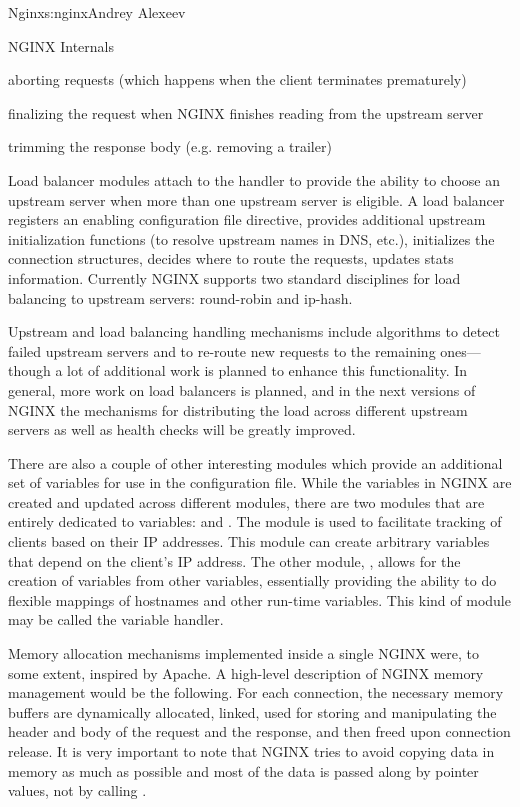 \begin{aosachapter}{Nginx}{s:nginx}{Andrey Alexeev}
\begin{aosasect1}{NGINX Internals}
\begin{aosaitemize}
\item aborting requests (which happens when the client terminates
  prematurely)

\item finalizing the request when NGINX finishes reading from the
  upstream server

\item trimming the response body (e.g. removing a trailer)

\end{aosaitemize}

Load balancer modules attach to the  handler to
provide the ability to choose an upstream server when more than one
upstream server is eligible. A load balancer registers an enabling
configuration file directive, provides additional upstream
initialization functions (to resolve upstream names in DNS, etc.),
initializes the connection structures, decides where to route the
requests, updates stats %
information. Currently NGINX supports two standard disciplines for
load balancing to upstream servers: round-robin and ip-hash.

Upstream and load balancing handling mechanisms include algorithms to
detect failed upstream servers and to re-route new requests to the
remaining ones---though a lot of additional work is planned to enhance
this functionality. In general, more work on load balancers is
planned, and in the next versions of NGINX the mechanisms for
distributing the load across different upstream servers as well as
health checks will be greatly improved.

There are also a couple of other interesting modules which provide an
additional set of variables for use in the configuration file. While
the variables in NGINX are created and updated across different
modules, there are two modules that are entirely dedicated to
variables:  and . The  module is used to
facilitate tracking of clients based on their IP addresses. This
module can create arbitrary variables that depend on the client's IP
address. The other module, , allows for the creation of
variables from other variables, essentially providing the ability to
do flexible mappings of hostnames and other run-time variables. This
kind of module may be called the variable handler.

Memory allocation mechanisms implemented inside a single NGINX
 were, to some extent, inspired by Apache. A high-level
description of NGINX memory management would be the following. For
each connection, the necessary memory buffers are dynamically
allocated, linked, used for storing and manipulating the header and
body of the request and the response, and then freed upon connection
release. It is very important to note that NGINX tries to avoid
copying data in memory as much as possible and most of the data is
passed along by pointer values, not by calling .


\end{aosasect1}
\end{aosachapter}

